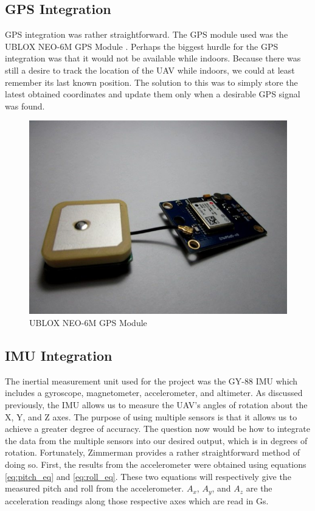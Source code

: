 \documentclass[english]{upeeei}
\begin{document}
\subsection{GPS Integration}
GPS integration was rather straightforward. The GPS module used was the UBLOX NEO-6M GPS Module \cite{EDWGPS}. Perhaps the biggest hurdle for the
GPS integration was that it would not be available while indoors. Because there was still a desire to track the location of the UAV while indoors,
we could at least remember its last known position. The solution to this was to simply store the latest obtained coordinates and update them only
when a desirable GPS signal was found.
\begin{figure}[h]
    \centering
    \includegraphics[scale=0.3]{images/gps_module.jpg}
    \caption{UBLOX NEO-6M GPS Module\cite{EDWGPS}}
    \label{fig:gps_module}
\end{figure}

\subsection{IMU Integration}
The inertial measurement unit used for the project was the GY-88 IMU \cite{EDWIMU} which includes a gyroscope, magnetometer, accelerometer, and
altimeter. As discussed previously, the IMU allows us to measure the UAV's angles of rotation about the X, Y, and Z axes. The purpose of using
multiple sensors is that it allows us to achieve a greater degree of accuracy. The question now would be how to integrate the data from the
multiple sensors into our desired output, which is in degrees of rotation. Fortunately, Zimmerman \cite{zimmerman2016} provides a rather
straightforward method of doing so. 
\newline
\newline
First, the results from the accelerometer were obtained using equations \ref{eq:pitch_eq} and \ref{eq:roll_eq}.
These two equations will respectively give the measured pitch and roll from the accelerometer. \(A_{x}\), \(A_{y}\), and \(A_{z}\) are the
acceleration readings along those respective axes which are read in Gs.
\end{document}
